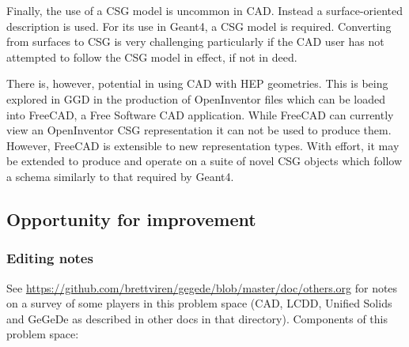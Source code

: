 Finally, the use of a CSG model is uncommon in CAD.  Instead a
surface-oriented description is used.  For its use in Geant4, a CSG
model is required.  Converting from surfaces to CSG is very
challenging particularly if the CAD user has not attempted to follow
the CSG model in effect, if not in deed.

There is, however, potential in using CAD with HEP geometries.  This
is being explored in GGD in the production of OpenInventor files which
can be loaded into FreeCAD, a Free Software CAD application.  While
FreeCAD can currently view an OpenInventor CSG representation it can
not be used to produce them.  However, FreeCAD is extensible to new
representation types.  With effort, it may be extended to produce and
operate on a suite of novel CSG objects which follow a schema
similarly to that required by Geant4.


\subsection{Opportunity for improvement}


\subsubsection{Editing notes}



See
\url{https://github.com/brettviren/gegede/blob/master/doc/others.org}
for notes on a survey of some players in this problem space (CAD,
LCDD, Unified Solids and GeGeDe as described in other docs in that
directory).  Components of this problem space:

